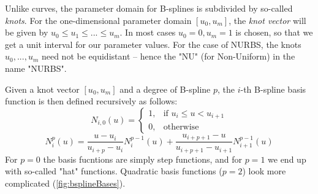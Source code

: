 Unlike \Bez curves, the parameter domain for B-splines is subdivided by so-called \textit{knots}. For the one-dimensional parameter domain $[u_{0}, u_{m}]$, the \textit{knot vector} will be given by $u_{0} \leq u_{1} \leq ... \leq u_{m}$. In most cases $u_{0} = 0, u_{m} = 1$ is chosen, so that we get a unit interval for our parameter values. For the case of NURBS, the knots $u_{0},..., u_{m}$ need not be equidistant -- hence the "NU" (for Non-Uniform) in the name "NURBS".

Given a knot vector $[u_{0}, u_{m}]$ and a degree of B-spline $p$, the $i$-th B-spline basis function is then defined recursively as follows:
\begin{equation}
N_{i,0}(u) =  \begin{cases} 1, & \mbox{if } u_{i} \leq u < u_{i+1} \\ 0, & \mbox{otherwise } \end{cases}
\end{equation} 
\begin{equation}
N_{i}^p(u) = \frac{u - u_{i}}{u_{i+p} - u_{i}}N_{i}^{p-1}(u)  + \frac{u_{i+p+1}-u}{u_{i+p+1} - u_{i+1}}N_{i+1}^{p-1}(u)
\end{equation}
For $p=0$ the basis fucntions are simply step functions, and for $p=1$ we end up with so-called "hat" functions. Quadratic basis functions ($p=2$) look more complicated (\autoref{fig:bsplineBases}).
